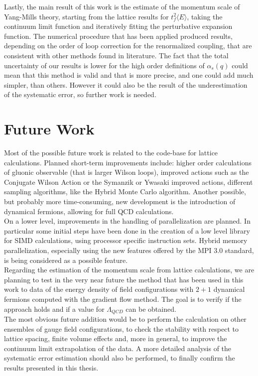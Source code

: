 Lastly, the main result of this work is the estimate of the momentum scale of Yang-Mills theory, starting from the lattice results for $t_f^2\langle E\rangle$, taking the continuum limit function and iteratively fitting the perturbative expansion function. The numerical procedure that has been applied produced results, depending on the order of loop correction for the renormalized coupling, that are consistent with other methods found in literature. The fact that the total uncertainty of our results is lower for the high order definitions of $\alpha_s(q)$ could mean that this method is valid and that is more precise, and one could add much simpler, than others. However it could also be the result of the underestimation of the systematic error, so further work is needed. 

\section{Future Work}
Most of the possible future work is related to the code-base for lattice calculations. Planned short-term improvements include: higher order calculations of gluonic observable (that is larger Wilson loops), improved actions such as the Conjugate Wilson Action or the Symanzik or Ywasaki improved actions, different sampling algorithms, like the Hybrid Monte Carlo algorithm. Another possible, but probably more time-consuming, new development is the introduction of dynamical fermions, allowing for full QCD calculations.\\
On a lower level, improvements in the handling of parallelization are planned. In particular some initial steps have been done in the creation of a low level library for SIMD calculations, using processor specific instruction sets. Hybrid memory parallelization, especially using the new features offered by the MPI 3.0 standard, is being considered as a possible feature.\\
    
Regarding the estimation of the momentum scale from lattice calculations, we are planning to test in the very near future the method that has been used in this work to data of the energy density of field configurations with $2+1$ dynamical fermions computed with the gradient flow method. The goal is to verify if the approach holds and if a value for $\Lambda_{QCD}$ can be obtained. \\
The most obvious future addition would be to perform the calculation on other ensembles of gauge field configurations, to check the stability with respect to lattice spacing, finite volume effects and, more in general, to improve the continuum limit extrapolation of the data. A more detailed analysis of the systematic error estimation should also be performed, to finally confirm the results presented in this thesis.